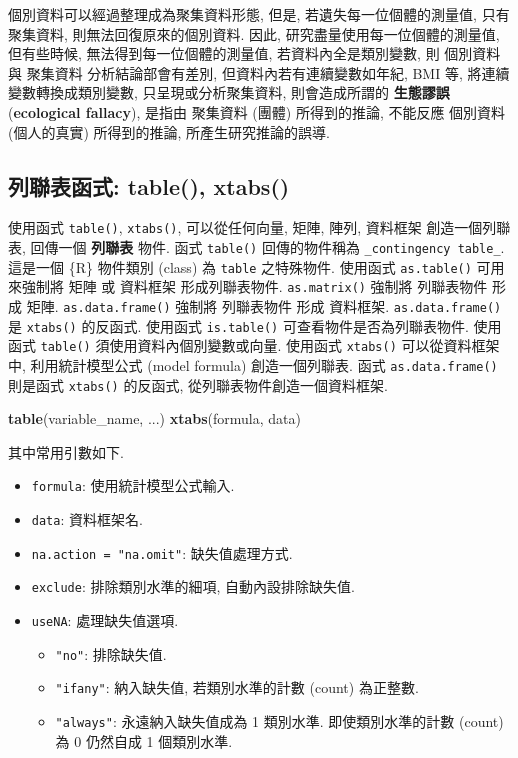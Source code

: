 \documentclass[
]{book}
\newenvironment{Shaded}{\begin{snugshade}}{\end{snugshade}}
\newcommand{\KeywordTok}[1]{\textcolor[rgb]{0.13,0.29,0.53}{\textbf{#1}}}
\newcommand{\NormalTok}[1]{#1}
\providecommand{\tightlist}{%
  \setlength{\itemsep}{0pt}\setlength{\parskip}{0pt}}
\begin{document}
個別資料可以經過整理成為聚集資料形態,
但是, 若遺失每一位個體的測量值, 只有聚集資料, 則無法回復原來的個別資料.
因此, 研究盡量使用每一位個體的測量值, 但有些時候, 無法得到每一位個體的測量值,
若資料內全是類別變數,
則 個別資料 與 聚集資料 分析結論部會有差別,
但資料內若有連續變數如年紀, BMI 等,
將連續變數轉換成類別變數, 只呈現或分析聚集資料,
則會造成所謂的
\textbf{生態謬誤}
(\textbf{ecological fallacy}),
是指由 聚集資料 (團體) 所得到的推論,
不能反應 個別資料 (個人的真實) 所得到的推論,
所產生研究推論的誤導.

\hypertarget{ux5217ux806fux8868ux51fdux5f0f-table-xtabs}{%
\subsection{列聯表函式: table(), xtabs()}\label{ux5217ux806fux8868ux51fdux5f0f-table-xtabs}}

使用函式
\texttt{table()},
\texttt{xtabs()},
可以從任何向量, 矩陣, 陣列, 資料框架
創造一個列聯表,
回傳一個
\textbf{列聯表}
物件.
函式
\texttt{table()}
回傳的物件稱為
\texttt{\_contingency\ table\_}.
這是一個 \{R\} 物件類別 (class)
為
\texttt{table}
之特殊物件.
使用函式
\texttt{as.table()}
可用來強制將 矩陣 或 資料框架 形成列聯表物件.
\texttt{as.matrix()} 強制將 列聯表物件 形成 矩陣.
\texttt{as.data.frame()} 強制將 列聯表物件 形成 資料框架.
\texttt{as.data.frame()} 是 \texttt{xtabs()} 的反函式.
使用函式
\texttt{is.table()}
可查看物件是否為列聯表物件.
使用函式
\texttt{table()}
須使用資料內個別變數或向量.
使用函式
\texttt{xtabs()}
可以從資料框架中,
利用統計模型公式 (model formula) 創造一個列聯表.
函式 \texttt{as.data.frame()}
則是函式
\texttt{xtabs()}
的反函式,
從列聯表物件創造一個資料框架.

\begin{Shaded}
\begin{Highlighting}[]
\KeywordTok{table}\NormalTok{(variable\_name, ...)}
\KeywordTok{xtabs}\NormalTok{(formula, data)}
\end{Highlighting}
\end{Shaded}

其中常用引數如下.

\begin{itemize}
\tightlist
\item
  \texttt{formula}: 使用統計模型公式輸入.
\item
  \texttt{data}: 資料框架名.
\item
  \texttt{na.action\ =\ "na.omit"}: 缺失值處理方式.
\item
  \texttt{exclude}: 排除類別水準的細項, 自動內設排除缺失值.
\item
  \texttt{useNA}: 處理缺失值選項.

  \begin{itemize}
  \tightlist
  \item
    \texttt{"no"}: 排除缺失值.
  \item
    \texttt{"ifany"}: 納入缺失值, 若類別水準的計數 (count) 為正整數.
  \item
    \texttt{"always"}: 永遠納入缺失值成為 1 類別水準. 即使類別水準的計數 (count) 為 0 仍然自成 1 個類別水準.
  \end{itemize}
\end{itemize}
\end{document}
